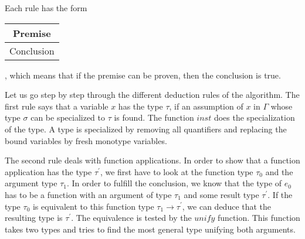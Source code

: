 \begin{prooftree}
\end{prooftree}

\begin{prooftree}
\end{prooftree}

Each rule has the form
\begin{tabular}{c}
Premise\\
\hline
Conclusion
\end{tabular}, which means that if the premise can be proven, then the conclusion is true.

Let us go step by step through the different deduction rules of the algorithm.
The first rule says that a variable $x$ has the type $\tau$, if an assumption of $x$ in $\Gamma$ whose type $\sigma$ can be specialized to $\tau$ is found.
The function $inst$ does the specialization of the type.
A type is specialized by removing all quantifiers and replacing the bound variables by fresh monotype variables.

The second rule deals with function applications.
In order to show that a function application has the type $\tau^\prime$, we first have to look at the function type $\tau_0$ and the argument type $\tau_1$.
In order to fulfill the conclusion, we know that the type of $e_0$ has to be a function with an argument of type $\tau_1$ and some result type $\tau^\prime$.
If the type $\tau_0$ is equivalent to this function type $\tau_1\rightarrow\tau^\prime$, we can deduce that the resulting type is $\tau^\prime$.
The equivalence is tested by the $unify$ function.
This function takes two types and tries to find the most general type unifying both arguments.

